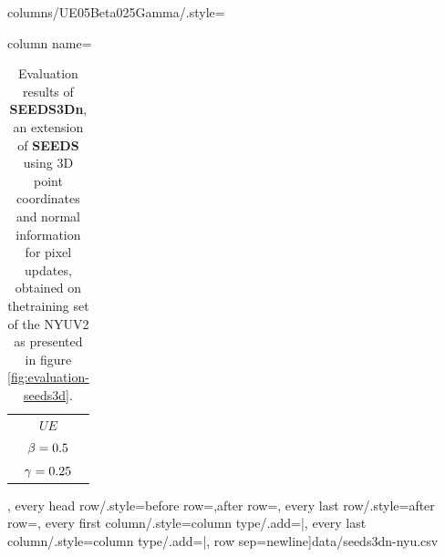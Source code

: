 \begin{table}[H]
		columns/UE05Beta025Gamma/.style={column name=\begin{tabular}{c}$UE$\\$\beta= 0.5$\\$\gamma= 0.25$\end{tabular}},%
		every head row/.style={before row=\hline,after row=\hline\hline},%
		every last row/.style={after row=\hline},%
		every first column/.style={column type/.add={|}{}},%
		every last column/.style={column type/.add={}{|}},%
		row sep=newline]{data/seeds3dn-nyu.csv}
	\caption[Evaluation results of \textbf{SEEDS3Dn}, an extension of \textbf{SEEDS} \cite{VanDenBerghBoixRoigVanGool:2013} using 3D point coordinates and normal information for pixel updates, obtained on the training set of the NYU Depth Dataset \cite{SilbermanHoiemKohliFergus:2012}.]{Evaluation results of \textbf{SEEDS3Dn}, an extension of \textbf{SEEDS} \cite{VanDenBerghBoixRoigVanGool:2013} using 3D point coordinates and normal information for pixel updates, obtained on thetraining set of the NYUV2 as presented in figure \ref{fig:evaluation-seeds3d}.}
\end{table}
